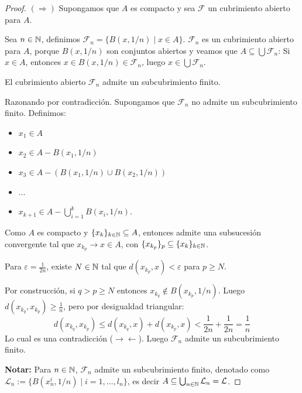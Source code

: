 \begin{proof}
    $(\Rightarrow)$ Supongamos que $A$ es compacto y sea $\mathcal{F}$ un cubrimiento abierto para $A$.
    
    Sea $n \in \mathbb{N}$, definimos $\mathcal{F}_n = \{ B(x, 1/n) \mid x \in A \}$. $\mathcal{F}_n$ es un cubrimiento abierto para $A$, porque $B(x, 1/n)$ son conjuntos abiertos y veamos que $A \subseteq \bigcup \mathcal{F}_n$: Si $x \in A$, entonces $x \in B(x, 1/n) \in \mathcal{F}_n$, luego $x \in \bigcup \mathcal{F}_n$.

    \begin{afirmacion}
        El cubrimiento abierto $\mathcal{F}_n$ admite un subcubrimiento finito.
    \end{afirmacion}
    
    \begin{prueba}
    Razonando por contradicción. Supongamos que $\mathcal{F}_n$ no admite un subcubrimiento finito. Definimos:
    \begin{itemize}
        \item $x_1 \in A$
        \item $x_2 \in A - B(x_1, 1/n)$
        \item $x_3 \in A - \left( B(x_1, 1/n) \cup B(x_2, 1/n) \right)$
        \item $\dots$
        \item $x_{k+1} \in A - \bigcup_{i=1}^k B(x_i, 1/n)$.
    \end{itemize}
    Como $A$ es compacto y $\{x_k\}_{k \in \mathbb{N}} \subseteq A$, entonces admite una subsucesión convergente tal que $x_{k_p} \rightarrow x \in A$, con $\{x_{k_p}\}_p \subseteq \{x_k\}_{k \in \mathbb{N}}$.
    
    Para $\varepsilon = \frac{1}{2n}$, existe $N \in \mathbb{N}$ tal que $d(x_{k_p}, x) < \varepsilon$ para $p \ge N$.
    
    Por construcción, si $q > p \ge N $ entonces $ x_{k_q} \notin B(x_{k_p}, 1/n)$. Luego $d(x_{k_q}, x_{k_p}) \ge \frac{1}{n}$, pero por desigualdad triangular:
    \[d(x_{k_q}, x_{k_p}) \le d(x_{k_q}, x) + d(x_{k_p}, x) < \frac{1}{2n} + \frac{1}{2n} = \frac{1}{n}\]
    Lo cual es una contradicción ($\rightarrow\leftarrow$). Luego $\mathcal{F}_n$ admite un subcubrimiento finito.
    \end{prueba}
    \vspace{.5cm}
    \textbf{Notar:} 
    Para $n \in \mathbb{N}$, $\mathcal{F}_n$ admite un subcubrimiento finito, denotado como $\mathcal{L}_n := \{ B(x_n^i, 1/n) \mid i = 1, \dots, l_n \}$, es decir $A \subseteq \bigcup_{n \in \mathbb{N}} \mathcal{L}_n = \mathcal{L}$.


\end{proof}
